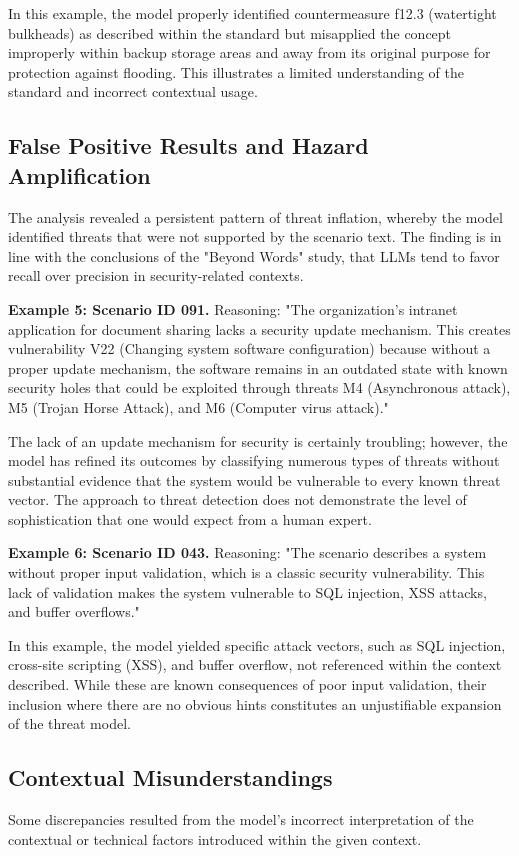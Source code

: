 \documentclass[sigconf]{acmart}
\begin{document}
In this example, the model properly identified countermeasure f12.3 (watertight bulkheads) as described within the standard but misapplied the concept improperly within backup storage areas and away from its original purpose for protection against flooding. This illustrates a limited understanding of the standard and incorrect contextual usage.

\subsection{False Positive Results and Hazard Amplification}
The analysis revealed a persistent pattern of threat inflation, whereby the model identified threats that were not supported by the scenario text. The finding is in line with the conclusions of the "Beyond Words" study, that LLMs tend to favor recall over precision in security-related contexts.

\textbf{Example 5: Scenario ID 091.} Reasoning: "The organization's intranet application for document sharing lacks a security update mechanism. This creates vulnerability V22 (Changing system software configuration) because without a proper update mechanism, the software remains in an outdated state with known security holes that could be exploited through threats M4 (Asynchronous attack), M5 (Trojan Horse Attack), and M6 (Computer virus attack)."

The lack of an update mechanism for security is certainly troubling; however, the model has refined its outcomes by classifying numerous types of threats without substantial evidence that the system would be vulnerable to every known threat vector. The approach to threat detection does not demonstrate the level of sophistication that one would expect from a human expert.

\textbf{Example 6: Scenario ID 043.} Reasoning: "The scenario describes a system without proper input validation, which is a classic security vulnerability. This lack of validation makes the system vulnerable to SQL injection, XSS attacks, and buffer overflows."

In this example, the model yielded specific attack vectors, such as SQL injection, cross-site scripting (XSS), and buffer overflow, not referenced within the context described. While these are known consequences of poor input validation, their inclusion where there are no obvious hints constitutes an unjustifiable expansion of the threat model.

\subsection{Contextual Misunderstandings}
Some discrepancies resulted from the model's incorrect interpretation of the contextual or technical factors introduced within the given context.
\end{document}
